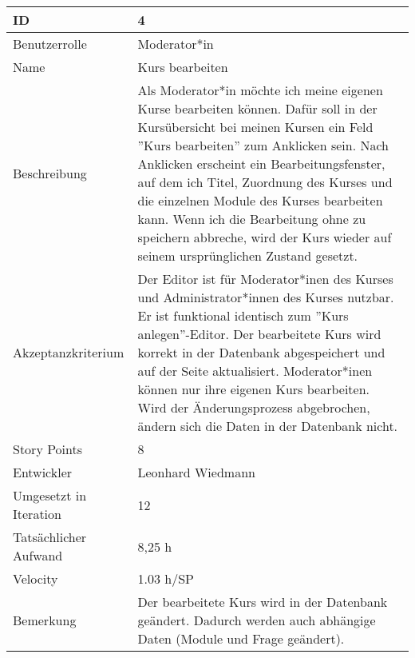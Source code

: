 \begin{tabularx}{\textwidth}{|p{}|X|}
	\hline
	ID & 4\\
	\hline
	Benutzerrolle & Moderator*in\\
	\hline
	Name & Kurs bearbeiten\\
	\hline
	Beschreibung & Als Moderator*in möchte ich meine eigenen Kurse bearbeiten können. Dafür soll in der Kursübersicht bei meinen Kursen ein Feld ''Kurs bearbeiten'' zum Anklicken sein. Nach Anklicken erscheint ein Bearbeitungsfenster, auf dem ich Titel, Zuordnung des Kurses und die einzelnen Module des Kurses bearbeiten kann. Wenn ich die Bearbeitung ohne zu speichern abbreche, wird der Kurs wieder auf seinem ursprünglichen Zustand gesetzt.\\
	\hline
	Akzeptanzkriterium & Der Editor ist für Moderator*inen des Kurses und Administrator*innen des Kurses nutzbar. Er ist funktional identisch zum ''Kurs anlegen''-Editor. Der bearbeitete Kurs wird korrekt in der Datenbank abgespeichert und auf der Seite aktualisiert. Moderator*inen können nur ihre eigenen Kurs bearbeiten. Wird der Änderungsprozess abgebrochen, ändern sich die Daten in der Datenbank nicht.\\
	\hline
	Story Points & 8 \\
	\hline
	Entwickler & Leonhard Wiedmann \\
	\hline
	Umgesetzt in Iteration & 12\\
	\hline
	Tatsächlicher Aufwand & 8,25 h \\
	\hline
	Velocity & 1.03 h/SP \\
	\hline
	Bemerkung & Der bearbeitete Kurs wird in der Datenbank geändert. Dadurch werden auch abhängige Daten (Module und Frage geändert).\\
	\hline
\end{tabularx}
\vspace{20pt}
